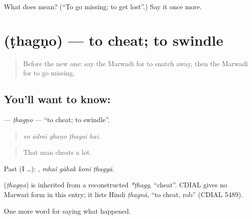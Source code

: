 \begin{tcolorbox}[breakable,colback=teal!4,colframe=teal!35!black,title={Before you move on}]
What does  mean? (\textquotedblleft{}To go missing; to get lost\textquotedblright{}.) Say it once more.
\end{tcolorbox}
\section[\texorpdfstring{\mw{ठगणो} (ṭhagṇo)}{ठगणो (ṭhagṇo)}]{ (ṭhagṇo) — to cheat; to swindle}

\label{lesson:MW-C243-thagno}



\begin{quote}
Before the new one: say the Marwadi for to snatch away, then the Marwadi for to go missing.
\end{quote}

\subsection*{You'll want to know: }
\textbf{} — \emph{ṭhagṇo} — \textquotedblleft{}to cheat; to swindle\textquotedblright{}.

\begin{quote}
    
\end{quote}

\begin{quote}
\emph{vo ādmī ghaṇo ṭhagai hai.}
\end{quote}

\begin{quote}
That man cheats a lot.
\end{quote}

Past (I …):    , \emph{mhaĩ gāhak konī ṭhagyā}.

\begin{cousinweb}
\textbf{} (\emph{ṭhagṇo}) is inherited from a reconstructed \emph{*ṭhagg}, \textquotedblleft{}cheat\textquotedblright{}. CDIAL gives no Marwari form in this entry; it lists Hindi \emph{ṭhagnā}, \textquotedblleft{}to cheat, rob\textquotedblright{} (CDIAL 5489).
\end{cousinweb}

\begin{grammarlens}[title={What you've built}]
One more word for saying what happened.
\end{grammarlens}

